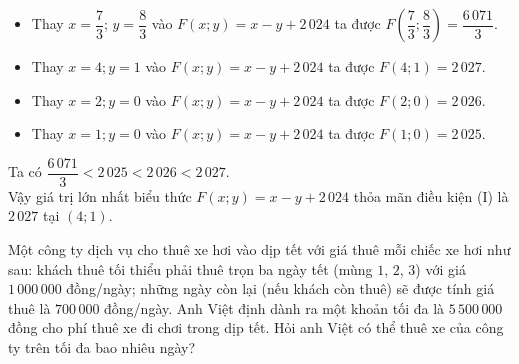 \begin{ex}
{		\begin{itemize}
			\item Thay $x=\dfrac{7}{3}$; $y=\dfrac{8}{3}$ vào $F(x;y)=x-y+2\,024$ ta được $F\left(\dfrac{7}{3};\dfrac{8}{3}\right)=\dfrac{6\,071}{3}$.
			\item Thay $x=4; y=1$ vào $F(x;y)=x-y+2\,024$ ta được $F(4;1)=2\,027$.
			\item Thay $x=2; y=0$ vào $F(x;y)=x-y+2\,024$ ta được $F(2;0)=2\,026$.
			\item Thay $x=1; y=0$ vào $F(x;y)=x-y+2\,024$ ta được $F(1;0)=2\,025$.
		\end{itemize}
		Ta có $\dfrac{6\,071}{3}<2\,025<2\,026<2\,027$.\\
		Vậy giá trị lớn nhất biểu thức $F(x; y)=x-y+2\,024$ thỏa mãn điều kiện (I) là $2\,027$ tại $(4;1)$.
	}
\end{ex}

\begin{ex}%
	Một công ty dịch vụ cho thuê xe hơi vào dịp tết với giá thuê mỗi chiếc xe hơi như sau: khách thuê tối thiểu phải thuê trọn ba ngày tết (mùng $1$, $2$, $3$) với giá $1\,000\,000$ đồng/ngày; những ngày còn lại (nếu khách còn thuê) sẽ được tính giá thuê là $700\,000$ đồng/ngày. Anh Việt định dành ra một khoản tối đa là $5\,500\,000$ đồng cho phí thuê xe đi chơi trong dịp tết. Hỏi anh Việt có thể thuê xe của công ty trên tối đa bao nhiêu ngày?
\end{ex}

